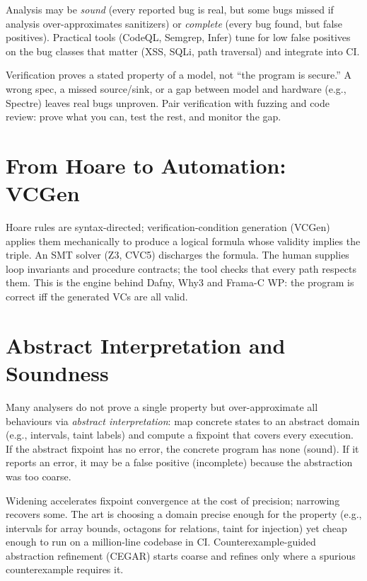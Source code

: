 Analysis may be \emph{sound} (every reported bug is real, but some bugs missed if analysis over-approximates sanitizers) or \emph{complete} (every bug found, but false positives). Practical tools (CodeQL, Semgrep, Infer) tune for low false positives on the bug classes that matter (XSS, SQLi, path traversal) and integrate into CI.

\begin{remark}
Verification proves a stated property of a model, not ``the program is secure.'' A wrong spec, a missed source/sink, or a gap between model and hardware (e.g., Spectre) leaves real bugs unproven. Pair verification with fuzzing and code review: prove what you can, test the rest, and monitor the gap.
\end{remark}

\section{From Hoare to Automation: VCGen}
\label{sec:vcgen}
Hoare rules are syntax-directed; verification-condition generation (VCGen) applies them mechanically to produce a logical formula whose validity implies the triple. An SMT solver (Z3, CVC5) discharges the formula. The human supplies loop invariants and procedure contracts; the tool checks that every path respects them. This is the engine behind Dafny, Why3 and Frama-C WP: the program is correct iff the generated VCs are all valid.

\section{Abstract Interpretation and Soundness}
\label{sec:abstract}
Many analysers do not prove a single property but over-approximate all behaviours via \emph{abstract interpretation}: map concrete states to an abstract domain (e.g., intervals, taint labels) and compute a fixpoint that covers every execution. If the abstract fixpoint has no error, the concrete program has none (sound). If it reports an error, it may be a false positive (incomplete) because the abstraction was too coarse.

Widening accelerates fixpoint convergence at the cost of precision; narrowing recovers some. The art is choosing a domain precise enough for the property (e.g., intervals for array bounds, octagons for relations, taint for injection) yet cheap enough to run on a million-line codebase in CI. Counterexample-guided abstraction refinement (CEGAR) starts coarse and refines only where a spurious counterexample requires it.

